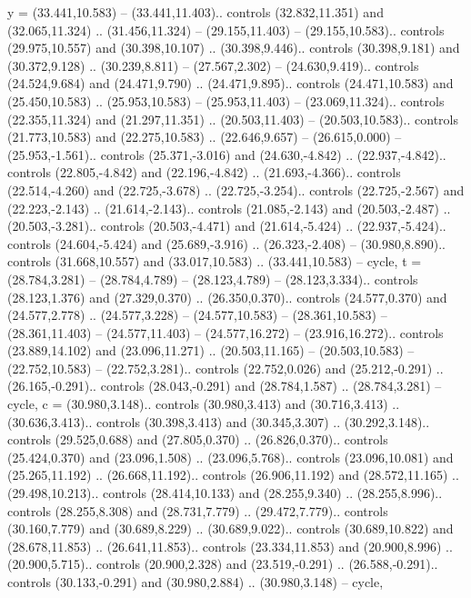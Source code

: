 {y} = {(33.441,10.583) -- (33.441,11.403).. controls (32.832,11.351) and (32.065,11.324) .. (31.456,11.324) -- (29.155,11.403) -- (29.155,10.583).. controls (29.975,10.557) and (30.398,10.107) .. (30.398,9.446).. controls (30.398,9.181) and (30.372,9.128) .. (30.239,8.811) -- (27.567,2.302) -- (24.630,9.419).. controls (24.524,9.684) and (24.471,9.790) .. (24.471,9.895).. controls (24.471,10.583) and (25.450,10.583) .. (25.953,10.583) -- (25.953,11.403) -- (23.069,11.324).. controls (22.355,11.324) and (21.297,11.351) .. (20.503,11.403) -- (20.503,10.583).. controls (21.773,10.583) and (22.275,10.583) .. (22.646,9.657) -- (26.615,0.000) -- (25.953,-1.561).. controls (25.371,-3.016) and (24.630,-4.842) .. (22.937,-4.842).. controls (22.805,-4.842) and (22.196,-4.842) .. (21.693,-4.366).. controls (22.514,-4.260) and (22.725,-3.678) .. (22.725,-3.254).. controls (22.725,-2.567) and (22.223,-2.143) .. (21.614,-2.143).. controls (21.085,-2.143) and (20.503,-2.487) .. (20.503,-3.281).. controls (20.503,-4.471) and (21.614,-5.424) .. (22.937,-5.424).. controls (24.604,-5.424) and (25.689,-3.916) .. (26.323,-2.408) -- (30.980,8.890).. controls (31.668,10.557) and (33.017,10.583) .. (33.441,10.583) -- cycle},
{t} = {(28.784,3.281) -- (28.784,4.789) -- (28.123,4.789) -- (28.123,3.334).. controls (28.123,1.376) and (27.329,0.370) .. (26.350,0.370).. controls (24.577,0.370) and (24.577,2.778) .. (24.577,3.228) -- (24.577,10.583) -- (28.361,10.583) -- (28.361,11.403) -- (24.577,11.403) -- (24.577,16.272) -- (23.916,16.272).. controls (23.889,14.102) and (23.096,11.271) .. (20.503,11.165) -- (20.503,10.583) -- (22.752,10.583) -- (22.752,3.281).. controls (22.752,0.026) and (25.212,-0.291) .. (26.165,-0.291).. controls (28.043,-0.291) and (28.784,1.587) .. (28.784,3.281) -- cycle},
{c} = {(30.980,3.148).. controls (30.980,3.413) and (30.716,3.413) .. (30.636,3.413).. controls (30.398,3.413) and (30.345,3.307) .. (30.292,3.148).. controls (29.525,0.688) and (27.805,0.370) .. (26.826,0.370).. controls (25.424,0.370) and (23.096,1.508) .. (23.096,5.768).. controls (23.096,10.081) and (25.265,11.192) .. (26.668,11.192).. controls (26.906,11.192) and (28.572,11.165) .. (29.498,10.213).. controls (28.414,10.133) and (28.255,9.340) .. (28.255,8.996).. controls (28.255,8.308) and (28.731,7.779) .. (29.472,7.779).. controls (30.160,7.779) and (30.689,8.229) .. (30.689,9.022).. controls (30.689,10.822) and (28.678,11.853) .. (26.641,11.853).. controls (23.334,11.853) and (20.900,8.996) .. (20.900,5.715).. controls (20.900,2.328) and (23.519,-0.291) .. (26.588,-0.291).. controls (30.133,-0.291) and (30.980,2.884) .. (30.980,3.148) -- cycle},

